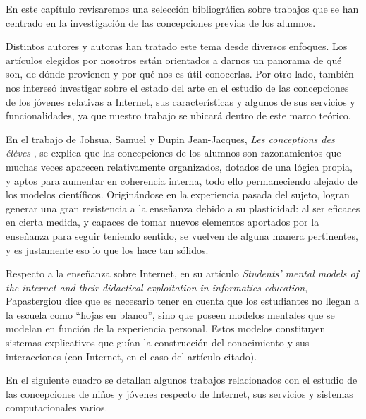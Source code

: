 En este capítulo revisaremos una selección bibliográfica sobre trabajos que se han centrado en la investigación de las concepciones previas de los alumnos.

Distintos autores y autoras han tratado este tema desde diversos enfoques. Los artículos elegidos por nosotros están orientados a darnos un panorama de qué son, de dónde provienen y por qué nos es útil conocerlas. Por otro lado, también nos interesó investigar sobre el estado del arte en el estudio de las concepciones de los jóvenes relativas a Internet, sus características y algunos de sus servicios y funcionalidades, ya que nuestro trabajo se ubicará dentro de este marco teórico.

En el trabajo de Johsua, Samuel y Dupin Jean-Jacques, \textit{Les conceptions des élèves} \cite{johsua}, se explica que las concepciones de los alumnos son razonamientos que muchas veces aparecen relativamente organizados, dotados de una lógica propia, y aptos para aumentar en coherencia interna, todo ello permaneciendo alejado de los modelos científicos. Originándose en la experiencia pasada del sujeto, logran generar una gran resistencia a la enseñanza debido a su plasticidad: al ser eficaces en cierta medida, y capaces de tomar nuevos elementos aportados por la enseñanza para seguir teniendo sentido, se vuelven de alguna manera pertinentes, y es justamente eso lo que los hace tan sólidos.

Respecto a la enseñanza sobre Internet, en su artículo \textit{Students’ mental models of the internet and their didactical exploitation in informatics education}, Papastergiou \cite{papastergiou} dice que es necesario tener en cuenta que los estudiantes no llegan a la escuela como “hojas en blanco”, sino que poseen modelos mentales que se modelan en función de la experiencia personal. Estos modelos constituyen sistemas explicativos que guían la construcción del conocimiento y sus interacciones (con Internet, en el caso del artículo citado).		

En el siguiente cuadro se detallan algunos trabajos relacionados con el estudio de las concepciones de niños y jóvenes respecto de Internet, sus servicios y sistemas computacionales varios.


